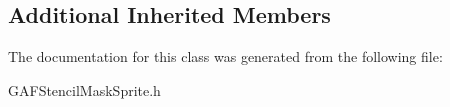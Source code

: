 \subsection*{Additional Inherited Members}


The documentation for this class was generated from the following file\-:\begin{DoxyCompactItemize}
\item 
G\-A\-F\-Stencil\-Mask\-Sprite.\-h\end{DoxyCompactItemize}

